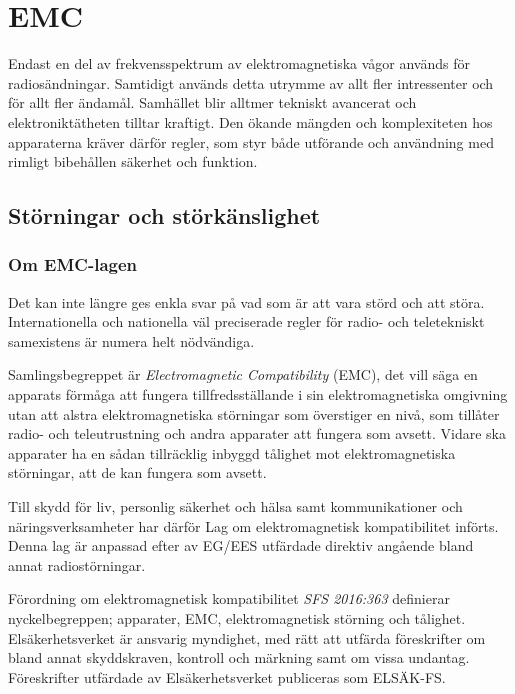 \chapter{EMC}

Endast en del av frekvensspektrum av elektromagnetiska vågor används för
radiosändningar.
Samtidigt används detta utrymme av allt fler intressenter och för allt fler
ändamål.
Samhället blir alltmer tekniskt avancerat och elektroniktätheten tilltar
kraftigt.
Den ökande mängden och komplexiteten hos apparaterna kräver därför regler, som
styr både utförande och användning med rimligt bibehållen säkerhet och funktion.

\section{Störningar och störkänslighet}

\subsection{Om EMC-lagen}
\label{EMC-lagen}

Det kan inte längre ges enkla svar på vad som är att vara störd och att störa.
Internationella och nationella väl preciserade regler för radio- och
teletekniskt samexistens är numera helt nödvändiga.

Samlingsbegreppet är \emph{Electromagnetic Compatibility} (EMC), det vill säga
en apparats förmåga att fungera tillfredsställande i sin elektromagnetiska
omgivning utan att alstra elektromagnetiska störningar som överstiger en nivå,
som tillåter radio- och teleutrustning och andra apparater att fungera som
avsett.
Vidare ska apparater ha en sådan tillräcklig inbyggd tålighet mot
elektromagnetiska störningar, att de kan fungera som avsett.

Till skydd för liv, personlig säkerhet och hälsa samt kommunikationer och
näringsverksamheter har därför Lag om elektromagnetisk kompatibilitet införts.
Denna lag är anpassad efter av EG/EES utfärdade direktiv angående bland annat
radiostörningar.

Förordning om elektromagnetisk kompatibilitet \emph{SFS 2016:363}
\cite{SFS2016:363} definierar nyckelbegreppen; apparater, EMC, elektromagnetisk
störning och tålighet.
Elsäkerhetsverket är ansvarig myndighet, med rätt att utfärda föreskrifter om
bland annat skyddskraven, kontroll och märkning samt om vissa undantag.
Föreskrifter utfärdade av Elsäkerhetsverket publiceras som ELSÄK-FS.

